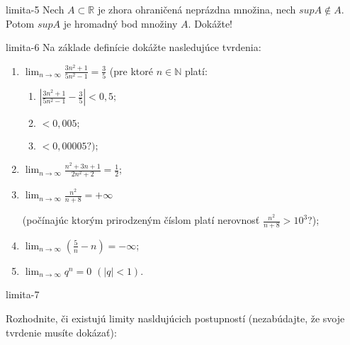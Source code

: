 \begin{defproblem}{limita-5}
Nech $A \subset \mathbb{R}$ je zhora ohraničená neprázdna množina, nech $sup A \notin A$. Potom $sup A$ je hromadný bod množiny $A$. Dokážte!
\end{defproblem}

\begin{defproblem}{limita-6}
 Na základe definície dokážte nasledujúce tvrdenia:
 \begin{enumerate}
 \item $\lim_{n \rightarrow \infty} \frac{3n^2+1}{5n^2-1}=\frac{3}{5}$ (pre ktoré $n \in \mathbb{N}$ platí: 
 \begin{enumerate}
 \item $|\frac{3n^2+1}{5n^2-1}-\frac{3}{5}|<0,5;$
 \item $<0,005;$
 \item $<0,00005 ?);$
 \end{enumerate}
 
 \item $\lim_{n \rightarrow \infty} \frac{n^2+3n+1}{2n^2+2}=\frac{1}{2}$;
 \item $\lim_{n \rightarrow \infty} \frac{n^2}{n+8}=+\infty$ 
 
 (počínajúc ktorým prirodzeným číslom platí nerovnosť $\frac{n^2}{n+8}>10^3$?);
 \item $\lim_{n \rightarrow \infty} (\frac{5}{n}-n)=-\infty$;
 \item $\lim_{n \rightarrow \infty} q^n=0$  $(|q|<1).$
 \end{enumerate}
\end{defproblem}

\begin{defproblem}{limita-7}

Rozhodnite, či existujú limity nasldujúcich postupností (nezabúdajte, že svoje tvrdenie musíte dokázať):
\end{defproblem}

